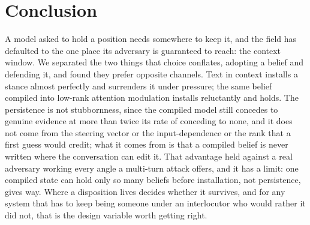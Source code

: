 \section{Conclusion}
\label{sec:conclusion}

A model asked to hold a position needs somewhere to keep it, and the field has defaulted
to the one place its adversary is guaranteed to reach: the context window. We separated
the two things that choice conflates, adopting a belief and defending it, and found they
prefer opposite channels. Text in context installs a stance almost perfectly and
surrenders it under pressure; the same belief compiled into low-rank attention modulation
installs reluctantly and holds. The persistence is not stubbornness, since the compiled
model still concedes to genuine evidence at more than twice its rate of conceding to
none, and it does not come from the steering vector or the input-dependence or the rank
that a first guess would credit; what it comes from is that a compiled belief is never
written where the conversation can edit it. That advantage held against a real
adversary working every angle a multi-turn attack offers, and it has a limit: one
compiled state can hold only so many beliefs before installation, not persistence,
gives way. Where a disposition lives decides whether it
survives, and for any system that has to keep being someone under an interlocutor who
would rather it did not, that is the design variable worth getting right.

